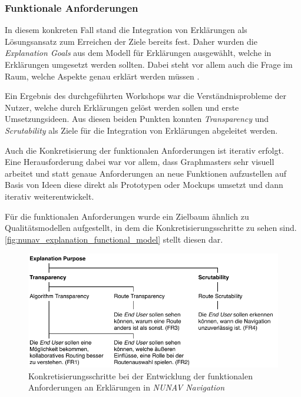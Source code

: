 \subsubsection{Funktionale Anforderungen}

In diesem konkreten Fall stand die Integration von Erklärungen als Lösungsansatz zum Erreichen der Ziele bereits fest. Daher wurden die \textit{Explanation Goals} aus dem Modell für Erklärungen ausgewählt, welche in Erklärungen umgesetzt werden sollten. Dabei steht vor allem auch die Frage im Raum, welche Aspekte genau erklärt werden müssen \cite{kohl_explainability_2019}.

Ein Ergebnis des durchgeführten Workshops war die Verständnisprobleme der Nutzer, welche durch Erklärungen gelöst werden sollen und erste Umsetzungsideen. Aus diesen beiden Punkten konnten \textit{Transparency} und \textit{Scrutability} als Ziele für die Integration von Erklärungen abgeleitet werden.

Auch die Konkretisierung der funktionalen Anforderungen ist iterativ erfolgt. Eine Herausforderung dabei war vor allem, dass Graphmasters sehr visuell arbeitet und statt genaue Anforderungen an neue Funktionen aufzustellen auf Basis von Ideen diese direkt als Prototypen oder Mockups umsetzt und dann iterativ weiterentwickelt.

Für die funktionalen Anforderungen wurde ein Zielbaum ähnlich zu Qualitätsmodellen aufgestellt, in dem die Konkretisierungsschritte zu sehen sind. \autoref{fig:nunav_explanation_functional_model} stellt diesen dar.

\begin{figure}[htb!]
    \centering
    \includegraphics[]{contents/06_model_evaluation/01_integration/res/functional_model.pdf}
    \caption{Konkretisierungsschritte bei der Entwicklung der funktionalen Anforderungen an Erklärungen in \textit{NUNAV Navigation}}
    \label{fig:nunav_explanation_functional_model}
\end{figure}

